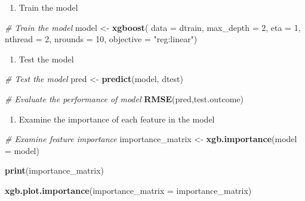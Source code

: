 \documentclass[]{book}
\newenvironment{Shaded}{\begin{snugshade}}{\end{snugshade}}
\newcommand{\KeywordTok}[1]{\textcolor[rgb]{0.13,0.29,0.53}{\textbf{#1}}}
\newcommand{\DataTypeTok}[1]{\textcolor[rgb]{0.13,0.29,0.53}{#1}}
\newcommand{\DecValTok}[1]{\textcolor[rgb]{0.00,0.00,0.81}{#1}}
\newcommand{\StringTok}[1]{\textcolor[rgb]{0.31,0.60,0.02}{#1}}
\newcommand{\CommentTok}[1]{\textcolor[rgb]{0.56,0.35,0.01}{\textit{#1}}}
\newcommand{\NormalTok}[1]{#1}
\providecommand{\tightlist}{%
  \setlength{\itemsep}{0pt}\setlength{\parskip}{0pt}}
\begin{document}
\begin{enumerate}
\def\labelenumi{\arabic{enumi})}
\setcounter{enumi}{4}
\tightlist
\item
  Train the model
\end{enumerate}

\begin{Shaded}
\begin{Highlighting}[]
\CommentTok{# Train the model}
\NormalTok{model <-}\StringTok{ }\KeywordTok{xgboost}\NormalTok{(}
  \DataTypeTok{data =}\NormalTok{ dtrain, }\DataTypeTok{max_depth =} \DecValTok{2}\NormalTok{, }\DataTypeTok{eta =} \DecValTok{1}\NormalTok{, }\DataTypeTok{nthread =} \DecValTok{2}\NormalTok{, }\DataTypeTok{nrounds =} \DecValTok{10}\NormalTok{,}
  \DataTypeTok{objective =} \StringTok{"reg:linear"}\NormalTok{)}
\end{Highlighting}
\end{Shaded}

\begin{enumerate}
\def\labelenumi{\arabic{enumi})}
\setcounter{enumi}{5}
\tightlist
\item
  Test the model
\end{enumerate}

\begin{Shaded}
\begin{Highlighting}[]
\CommentTok{# Test the model}
\NormalTok{pred <-}\StringTok{ }\KeywordTok{predict}\NormalTok{(model, dtest)}

\CommentTok{# Evaluate the performance of model}
\KeywordTok{RMSE}\NormalTok{(pred,test.outcome)}
\end{Highlighting}
\end{Shaded}

\begin{enumerate}
\def\labelenumi{\arabic{enumi})}
\setcounter{enumi}{6}
\tightlist
\item
  Examine the importance of each feature in the model
\end{enumerate}

\begin{Shaded}
\begin{Highlighting}[]
\CommentTok{# Examine feature importance}
\NormalTok{importance_matrix <-}\StringTok{ }\KeywordTok{xgb.importance}\NormalTok{(}\DataTypeTok{model =}\NormalTok{ model)}

\KeywordTok{print}\NormalTok{(importance_matrix)}

\KeywordTok{xgb.plot.importance}\NormalTok{(}\DataTypeTok{importance_matrix =}\NormalTok{ importance_matrix)}
\end{Highlighting}
\end{Shaded}
\end{document}
